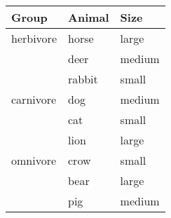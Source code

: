 \documentclass{article}
\begin{document}
	\begin{tabular}{lll}
		\toprule
		Group     & Animal & Size   \\
		\midrule
		herbivore & horse  & large  \\
		& deer   & medium \\
		& rabbit & small  \\
		\addlinespace
		carnivore & dog    & medium \\
		& cat    & small  \\
		& lion   & large  \\
		\addlinespace
		omnivore  & crow   & small  \\
		& bear   & large  \\
		& pig    & medium \\
		\bottomrule
	\end{tabular}
\end{document}
